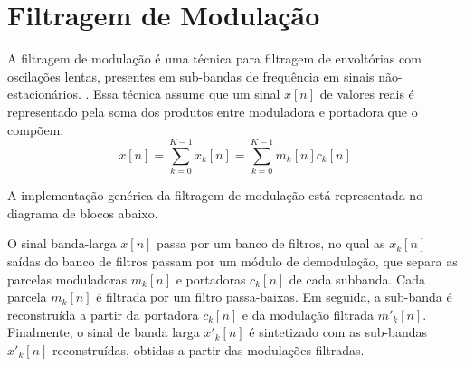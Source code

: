 \section{Filtragem de Modulação}
A filtragem de modulação é uma técnica para filtragem de envoltórias com
oscilações lentas, presentes em sub-bandas de frequência em sinais
não-estacionários.\cite{clark2009sum} \cite{li2005properties}. Essa técnica assume que um sinal $x[n]$ de valores reais é representado pela
soma dos produtos entre moduladora e portadora que o compõem:
\begin{equation}
    x[n] = \sum_{k = 0}^{K - 1} x_k[n] = \sum_{k = 0}^{K - 1} m_k[n] c_k[n]
\end{equation}


A implementação genérica da filtragem de modulação está representada no diagrama de blocos abaixo.

\begin{figure}[h]
    \centering
\end{figure}

O sinal banda-larga $x[n]$ passa por um banco de filtros, no
qual as  $x_k[n]$ saídas do banco de filtros passam por um módulo de
demodulação, que separa as parcelas moduladoras $m_k[n]$ e portadoras $c_k[n]$
de cada subbanda. Cada parcela $m_k[n]$ é filtrada por um filtro passa-baixas.
Em seguida, a sub-banda é reconstruída a partir da portadora $c_k[n]$ e da
modulação filtrada $m'_k[n]$. Finalmente, o sinal de banda larga $x'_k[n]$ é
sintetizado com as sub-bandas $x'_k[n]$ reconstruídas, obtidas a partir das
modulações filtradas.


